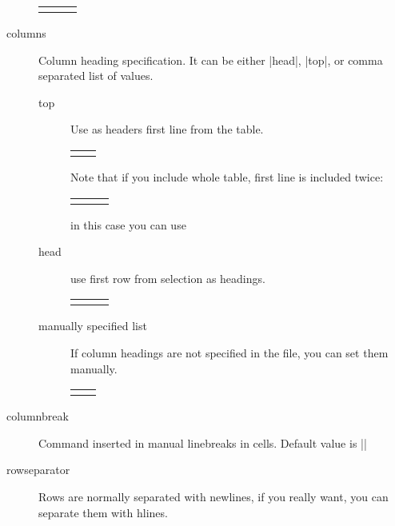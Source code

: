\documentclass{ltxdoc}
\begin{document}
\begin{description}
\begin{LTXexample}
\begin{tabular}{lll}
\end{tabular}     
\end{LTXexample}  

\item[columns] Column heading specification. It can be either |head|, |top|, or comma separated list of values.
\begin{description}
\item[top] Use as headers first line from the table.
\begin{LTXexample}
\begin{tabular}{ll}
\end{tabular}
\end{LTXexample}
Note that if you include whole table, first line is included twice:
\begin{LTXexample}
\begin{tabular}{lll}
\end{tabular}     
\end{LTXexample}
in this case you can use
\item[head] use first row from selection as headings.
\begin{LTXexample}
\begin{tabular}{lll}
\end{tabular}     
\end{LTXexample}
\item[manually specified list] If column headings are not specified in the file, you can set them manually.
\begin{LTXexample}
\begin{tabular}{ll}
\end{tabular}     
\end{LTXexample}
\end{description}
\item[columnbreak] Command inserted in manual linebreaks in cells. Default value is |\linebreak|

\item[rowseparator] Rows are normally separated with newlines, if you really want, you can separate them with hlines. 


\end{description}
\end{document}
